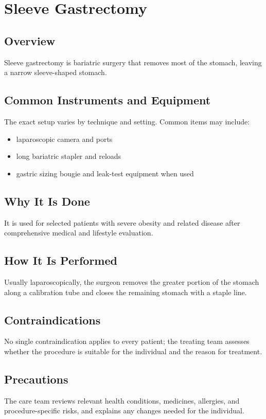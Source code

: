 \chapter{Sleeve Gastrectomy}
\section*{Overview}
Sleeve gastrectomy is bariatric surgery that removes most of the stomach, leaving a narrow sleeve-shaped stomach.
\section*{Common Instruments and Equipment}
The exact setup varies by technique and setting. Common items may include:
\begin{itemize}[nosep,leftmargin=*]
  \item laparoscopic camera and ports
  \item long bariatric stapler and reloads
  \item gastric sizing bougie and leak-test equipment when used
\end{itemize}

\section*{Why It Is Done}
It is used for selected patients with severe obesity and related disease after comprehensive medical and lifestyle evaluation.
\section*{How It Is Performed}
Usually laparoscopically, the surgeon removes the greater portion of the stomach along a calibration tube and closes the remaining stomach with a staple line.
\section*{Contraindications}
No single contraindication applies to every patient; the treating team assesses whether the procedure is suitable for the individual and the reason for treatment.

\section*{Precautions}
The care team reviews relevant health conditions, medicines, allergies, and procedure-specific risks, and explains any changes needed for the individual.

